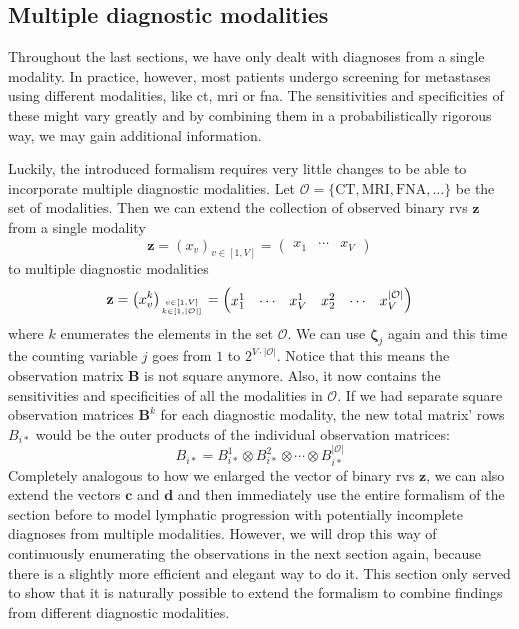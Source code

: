 \documentclass[\relativeRoot/main.tex]{subfiles}
\begin{document}
\subsection{Multiple diagnostic modalities}
\label{subsec:unilateral:formalism:multimodality}

Throughout the last sections, we have only dealt with diagnoses from a single modality. In practice, however, most patients undergo screening for metastases using different modalities, like \gls{ct}, \gls{mri} or \gls{fna}. The sensitivities and specificities of these might vary greatly and by combining them in a probabilistically rigorous way, we may gain additional information.

Luckily, the introduced formalism requires very little changes to be able to incorporate multiple diagnostic modalities. Let $\mathcal{O} = \{ \text{CT}, \text{MRI}, \text{FNA}, \ldots \}$ be the set of modalities. Then we can extend the collection of observed binary \glspl{rv} $\mathbf{z}$ from a single modality
%
\begin{equation}
    \mathbf{z} = \left( x_v \right)_{v \in [1,V]} =
    \begin{pmatrix}
        x_1 & \cdots & x_V
    \end{pmatrix}
\end{equation}
%
to multiple diagnostic modalities
%
\begin{equation}
    \mathbf{z} = \left( x_v^k \right)_{v \in [1,V] \atop k \in [1, |\mathcal{O}|]} =
    \begin{pmatrix}
        x_1^1 & \cdots & x_V^1 & x_2^2 & \cdots & x_V^{|\mathcal{O}|}
    \end{pmatrix}
\end{equation}
%
where $k$ enumerates the elements in the set $\mathcal{O}$. We can use $\boldsymbol{\zeta}_j$ again and this time the counting variable $j$ goes from $1$ to $2^{V \cdot |\mathcal{O}|}$. Notice that this means the observation matrix $\mathbf{B}$ is not square anymore. Also, it now contains the sensitivities and specificities of all the modalities in $\mathcal{O}$. If we had separate square observation matrices $\mathbf{B}^k$ for each diagnostic modality, the new total matrix' rows $B_{i*}$ would be the outer products of the individual observation matrices:
%
\begin{equation}
    B_{i*} = B_{i*}^1 \otimes B_{i*}^2 \otimes \cdots \otimes B_{i*}^{|\mathcal{O}|}
\end{equation}
%
Completely analogous to how we enlarged the vector of binary \glspl{rv} $\mathbf{z}$, we can also extend the vectors $\mathbf{c}$ and $\mathbf{d}$ and then immediately use the entire formalism of the section before to model lymphatic progression with potentially incomplete diagnoses from multiple modalities. However, we will drop this way of continuously enumerating the observations in the next section again, because there is a slightly more efficient and elegant way to do it. This section only served to show that it is naturally possible to extend the formalism to combine findings from different diagnostic modalities.
\end{document}
